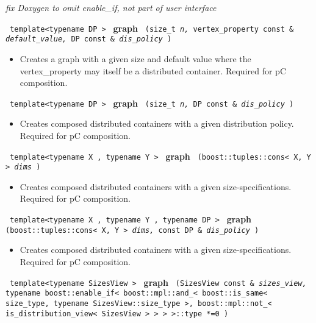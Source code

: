 \vspace{0.4cm} \emph{fix Doxygen to omit enable\_if, not part of user interface}
 
\noindent
\texttt{%
template<typename DP >
}
\newline
\textbf{graph}%
\texttt{%
(size\_t 
\textit{n,}%
vertex\_property const \&
\textit{default\_value,}%
DP const \&
\textit{dis\_policy}%
)
}

\begin{itemize}
\item
Creates a graph with a given size and default value where the vertex\_property may itself be a distributed container. Required for pC composition. 
\end{itemize}
 
\noindent
\texttt{%
template<typename DP >
}
\newline
\textbf{graph}%
\texttt{%
(size\_t 
\textit{n,}%
DP const \&
\textit{dis\_policy}%
)
}

\begin{itemize}
\item
Creates composed distributed containers with a given distribution policy. Required for pC composition. 
\end{itemize}
 
\noindent
\texttt{%
template<typename X , typename Y >
}
\newline
\textbf{graph}%
\texttt{%
(boost::tuples::cons< X, Y > 
\textit{dims}%
)
}

\begin{itemize}
\item
Creates composed distributed containers with a given size-specifications. Required for pC composition. 
\end{itemize}
 
\noindent
\texttt{%
template<typename X , typename Y , typename DP >
}
\newline
\textbf{graph}%
\texttt{%
(boost::tuples::cons< X, Y > 
\textit{dims,}%
const DP \&
\textit{dis\_policy}%
)
}

\begin{itemize}
\item
Creates composed distributed containers with a given size-specifications. Required for pC composition. 
\end{itemize}
 
\noindent
\texttt{%
template<typename SizesView >
}
\newline
\textbf{graph}%
\texttt{%
(SizesView const \&
\textit{sizes\_view,}%
typename boost::enable\_if< boost::mpl::and\_< boost::is\_same< size\_type, 
typename SizesView::size\_type >, boost::mpl::not\_< is\_distribution\_view< SizesView > > > >::type *=0
)
}

